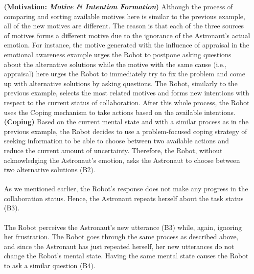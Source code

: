\noindent\textbf{(Motivation: \textit{Motive \& Intention Formation})} Although
the process of comparing and sorting available motives here is similar to the
previous example, all of the new motives are different. The reason is that each
of the three sources of motives forms a different motive due to the ignorance of
the Astronaut's actual emotion. For instance, the motive generated with the
influence of appraisal in the emotional awareness example urges the Robot to
postpone asking questions about the alternative solutions while the motive with
the same cause (i.e., appraisal) here urges the Robot to immediately try to fix
the problem and come up with alternative solutions by asking questions. The
Robot, similarly to the previous example, selects the most related motives and
forms new intentions with respect to the current status of collaboration. After
this whole process, the Robot uses the Coping mechanism to take actions based on
the available intentions.\\

\noindent\textbf{(Coping)} Based on the current mental state and with a similar
process as in the previous example, the Robot decides to use a problem-focused
coping strategy of seeking information to be able to choose between two
available actions and reduce the current amount of uncertainty. Therefore, the
Robot, without acknowledging the Astronaut's emotion, asks the Astronaut to
choose between two alternative solutions (B2).\\

\noindent{}\\

As we mentioned earlier, the Robot's response does not make any progress in the
collaboration status. Hence, the Astronaut repeats herself about the task status
(B3).\\

\noindent{}\\

The Robot perceives the Astronaut's new utterance (B3) while, again, ignoring
her frustration. The Robot goes through the same process as described above, and
since the Astronaut has just repeated herself, her new utterances do not change
the Robot's mental state. Having the same mental state causes the Robot to ask a
similar question (B4).\\

